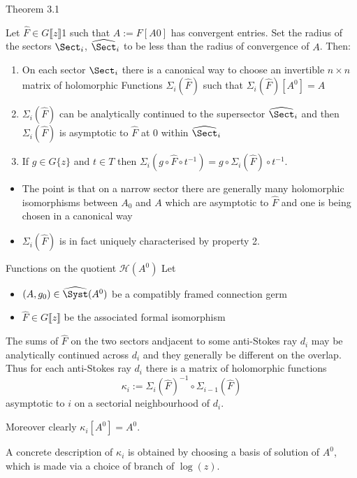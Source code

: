 \begin{frame}{Theorem 3.1}
  \begin{thm}
    Let $\hat{F}\in G\llbracket z\rrbracket$1 such that $A:=F[A0]$ has
    convergent entries.
    Set the radius of the sectors $\Sect_i$, $\widehat\Sect_i$ to be less than
    the radius of convergence of $A$.
    Then:
    \begin{enumerate}
      \item On each sector $\Sect_i$ there is a canonical way to choose an
        invertible $n\times n$ matrix of holomorphic Functions
        $\Sigma_i(\hat F)$ such that $\Sigma_i(\hat F)[A^0]=A$
      \item $\Sigma_i(\hat F)$ can be analytically continued to the supersector
        $\widehat\Sect_i$ and then $\Sigma_i(\hat F)$ is asymptotic to $\hat F$
        at $0$ within $\widehat\Sect_i$
      \item If $g\in G\{z\}$ and $t\in T$ then
        $\Sigma_i(g\circ\hat F \circ t^{-1})=g\circ\Sigma_i(\hat F)\circ t^{-1}$.
    \end{enumerate}
  \end{thm}
  \begin{itemize}
    \item The point is that on a narrow sector there are generally many
      holomorphic isomorphisms between $A_0$ and $A$ which are asymptotic to
      $\hat F$ and one is being chosen in a canonical way
    \item $\Sigma_i(\hat F)$ is in fact uniquely characterised by property 2.
  \end{itemize}
\end{frame}

\begin{frame}{Functions on the quotient $\mathcal{H}(A^0)$}
  Let
  \begin{itemize}
    \item $(A,g_0)\in\widehat\Syst(A^0)$ be a compatibly framed connection germ
    \item $\hat F\in G\llbracket z\rrbracket$ be the associated  formal
      isomorphism
  \end{itemize}
  The sums of $\hat F$ on the two sectors andjacent to some anti-Stokes ray
  $d_i$ may be analytically continued across $d_i$ and they generally be
  different on the overlap.
  Thus for each anti-Stokes ray $d_i$ there is a matrix of holomorphic
  functions
  \[
    \kappa_i:=\Sigma_i(\hat F)^{-1}\circ\Sigma_{i-1}(\hat F)
  \]
  asymptotic to $i$ on a sectorial neighbourhood of $d_i$.

  Moreover \textcolor{red!60!black}{clearly} $\kappa_i[A^0]=A^0$.

  A concrete description of $\kappa_i$ is obtained by choosing a basis of
  solution of $A^0$, which is made via a choice of branch of $\log(z)$.
\end{frame}

